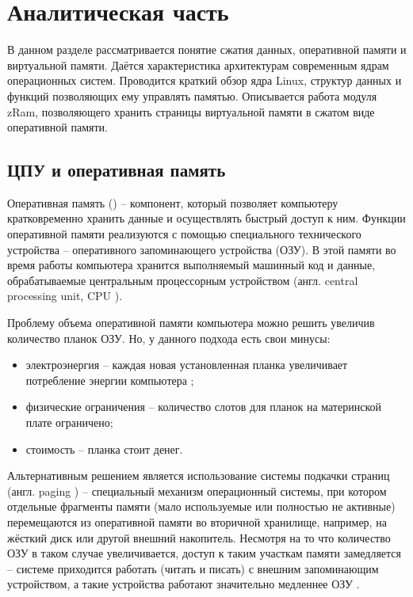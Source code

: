 \section{Аналитическая часть}

В данном разделе рассматривается понятие сжатия данных, оперативной памяти и виртуальной памяти. Даётся характеристика архитектурам современным ядрам операционных систем. Проводится краткий обзор ядра Linux, структур данных и функций позволяющих ему управлять памятью. Описывается работа модуля zRam, позволяющего хранить страницы виртуальной памяти в сжатом виде оперативной памяти.

\subsection{ЦПУ и оперативная память} 

Оперативная память (\cite{ram}) -- компонент, который позволяет компьютеру кратковременно хранить данные и осуществлять быстрый доступ к ним. Функции оперативной памяти реализуются с помощью специального технического устройства -- оперативного запоминающего устройства (ОЗУ). В этой памяти во время работы компьютера хранится выполняемый машинный код и данные, обрабатываемые центральным процессорным устройством (англ. central processing unit, CPU \cite{cpu}).

Проблему объема оперативной памяти компьютера можно решить увеличив количество планок ОЗУ. Но, у данного подхода есть свои минусы:

\begin{itemize}
	\item электроэнергия -- каждая новая установленная планка увеличивает потребление энергии компьютера \cite{increasing-ram-bad};
	\item физические ограничения -- количество слотов для планок на материнской плате ограничено;
	\item стоимость -- планка стоит денег.
\end{itemize}

Альтернативным решением является использование системы подкачки страниц (англ. paging \cite{paging}) -- специальный механизм операционный системы, при котором отдельные фрагменты памяти (мало используемые или полностью не активные) перемещаются из оперативной памяти во вторичной хранилище, например, на жёсткий диск или другой внешний накопитель. Несмотря на то что количество ОЗУ в таком случае увеличивается, доступ к таким участкам памяти замедляется -- системе приходится работать (читать и писать) с внешним запоминающим устройством, а такие устройства работают значительно медленнее ОЗУ \cite{ssd-hdd-speed}.

